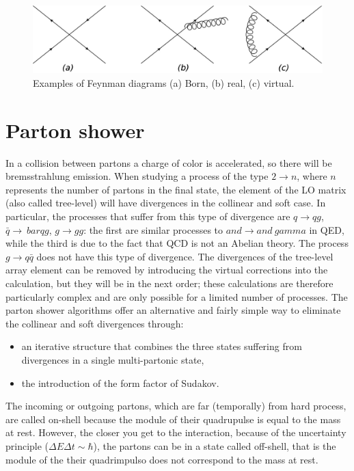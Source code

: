 \begin{figure}
\centering
\includegraphics[scale=0.22]{../Cap3/Fig_MC/nlo2}
\caption{ Examples of Feynman diagrams (a)  Born, (b) real, (c) virtual. }
\label{nlofig}
\end{figure}

 
\section{Parton shower}
In a collision between partons a charge of color is accelerated, so there will be bremsstrahlung emission. When studying a process of the type $ 2 \rightarrow n $, where $ n $ represents the number of partons in the final state, the element of the LO matrix (also called tree-level) will have divergences in the collinear  and 
soft case. In particular, the processes that suffer from this type of divergence are $ q \rightarrow qg $, $ \bar {q} \rightarrow \ bar{q} g $, $ g \rightarrow gg $: the first are similar processes to $ and \rightarrow and \ gamma $ in QED, while the third is due to the fact that QCD is not an Abelian theory. The process $ g \rightarrow q \bar {q} $ does not have this type of divergence.
The divergences of the tree-level array element can be removed by introducing the virtual corrections into the calculation, but they will be in the next order; these calculations are therefore particularly complex and are only possible for a limited number of processes. The parton shower \cite{Sjostrand: 2006su} algorithms offer an alternative and fairly simple way to eliminate the collinear and soft divergences through:
\begin{itemize}
\item an iterative structure that combines the three states suffering from divergences in a single multi-partonic state,
\item the introduction of the form factor of Sudakov.
\end{itemize}
The incoming or outgoing partons, which are far (temporally) from hard process, are called on-shell because the module of their quadrupulse is equal to the mass at rest.
However, the closer you get to the interaction, because of the uncertainty principle ($ \Delta E \Delta t \sim \hbar $), the partons can be in a state called off-shell, that is the module of the their quadrimpulso does not correspond to the mass at rest. 
